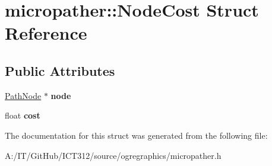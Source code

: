 \hypertarget{structmicropather_1_1_node_cost}{\section{micropather\-:\-:Node\-Cost Struct Reference}
\label{structmicropather_1_1_node_cost}
}
\subsection*{Public Attributes}
\begin{DoxyCompactItemize}
\item 
\hypertarget{structmicropather_1_1_node_cost_a0fac510eb20aeaa8704363b4af5177f8}{\hyperlink{classmicropather_1_1_path_node}{Path\-Node} $\ast$ {\bfseries node}}\label{structmicropather_1_1_node_cost_a0fac510eb20aeaa8704363b4af5177f8}

\item 
\hypertarget{structmicropather_1_1_node_cost_a633396145abc66f6bc93830c2f76ca23}{float {\bfseries cost}}\label{structmicropather_1_1_node_cost_a633396145abc66f6bc93830c2f76ca23}

\end{DoxyCompactItemize}


The documentation for this struct was generated from the following file\-:\begin{DoxyCompactItemize}
\item 
A\-:/\-I\-T/\-Git\-Hub/\-I\-C\-T312/source/ogregraphics/micropather.\-h\end{DoxyCompactItemize}
